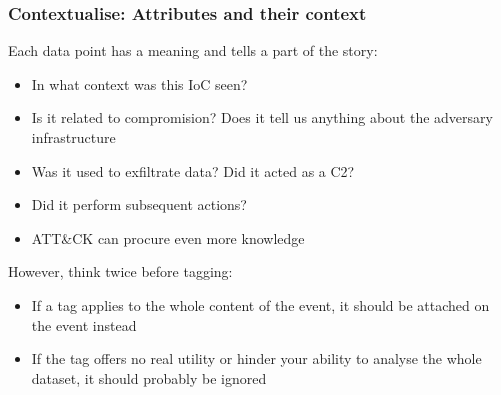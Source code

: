 \begin{frame}
    \frametitle{Contextualise: Attributes and their context}
    Each data point has a meaning and tells a part of the story:
    \begin{itemize}
        \item In what context was this IoC seen?
        \item Is it related to compromision? Does it tell us anything about the adversary infrastructure
        \item Was it used to exfiltrate data? Did it acted as a C2?
        \item Did it perform subsequent actions?
        \item ATT\&CK can procure even more knowledge
    \end{itemize}

    However, think twice before tagging:
    \begin{itemize}
        \item If a tag applies to the whole content of the event, it should be attached on the event instead
        \item If the tag offers no real utility or hinder your ability to analyse the whole dataset, it should probably be ignored
    \end{itemize}
\end{frame}

